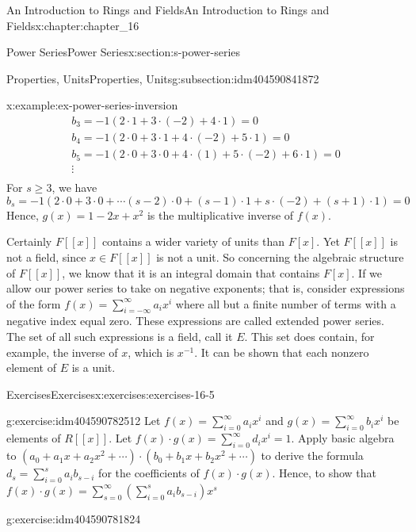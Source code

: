 \documentclass[twoside,10pt,]{book}
\numberwithin{equation}{section}
\begin{document}
\begin{chapterptx}{An Introduction to Rings and Fields}{}{An Introduction to Rings and Fields}{}{}{x:chapter:chapter_16}
\begin{sectionptx}{Power Series}{}{Power Series}{}{}{x:section:s-power-series}
\begin{subsectionptx}{Properties, Units}{}{Properties, Units}{}{}{g:subsection:idm404590841872}
\begin{example}{}{x:example:ex-power-series-inversion}
\begin{equation*}
\begin{array}{c}
b_3= -1(2\cdot 1 + 3\cdot (-2)+4\cdot 1)=0\\
b_4= -1(2\cdot 0+3\cdot 1 + 4\cdot (-2)+5\cdot 1)=0\\
b_5= -1(2\cdot 0+3\cdot 0+4\cdot (1)+5\cdot (-2)+6\cdot 1)=0\\
\vdots \\
\end{array}
\end{equation*}
For \(s \geq 3\), we have%
\begin{equation*}
b_s= -1(2\cdot 0 + 3\cdot 0+\cdots (s-2)\cdot 0+(s-1)\cdot 1+s\cdot (-2)+(s+1)\cdot 1)=0
\end{equation*}
Hence, \(g(x) = 1 - 2x +x^2\) is the multiplicative inverse of \(f(x)\).%
\end{example}
Certainly \(F[[x]]\) contains a wider variety of units than \(F[x]\). Yet \(F[[x]]\) is not a field, since \(x\in  F[[x]]\) is not a unit. So concerning the algebraic structure of \(F[[x]]\), we know that it is an integral domain that contains \(F[x]\). If we allow our power series to take on negative exponents; that is, consider expressions of the form \(f(x) =\sum_{i=-\infty }^{\infty } a_i x^i\) where all but a finite number of terms with a negative index equal zero.  These expressions are called extended power series. The set of all such expressions is a field, call it \(E\). This set does contain, for example, the inverse of \(x\), which is \(x^{-1}\). It can be shown that each nonzero element of \(E\) is a unit.%
\end{subsectionptx}
%
%
\typeout{************************************************}
\typeout{************************************************}
%
\begin{exercises-subsection}{Exercises}{}{Exercises}{}{}{x:exercises:exercises-16-5}
\begin{divisionexercise}{1}{}{}{g:exercise:idm404590782512}%
Let \(f(x)=\sum_{i=0}^{\infty} a_i x^i\)  and  \(g(x)=\sum_{i=0}^{\infty } b_i x^i\) be elements of \(R[[x]]\).  Let  \(f(x) \cdot  g(x) =\sum_{i=0}^{\infty } d_i x^i= 1\).   Apply basic algebra to \(\left(a_0 + a_1 x+a_2 x^2+ \cdots \right)\cdot \left(b_0 + b_1 x+b_2 x^2+ \cdots \right)\) to derive the formula \(d_s= \sum_{i=0}^s a_i b_{s-i}\) for the coefficients of \(f(x) \cdot  g(x)\). Hence, to show that \(f(x) \cdot  g(x) =\sum_{s=0}^{\infty } \left(\sum_{i=0}^s a_i b_{s-i}\right) x^s\)%
\end{divisionexercise}%
\begin{divisionexercise}{2}{}{}{g:exercise:idm404590781824}%

\end{divisionexercise}
\end{exercises-subsection}
\end{sectionptx}
\end{chapterptx}
\end{document}
